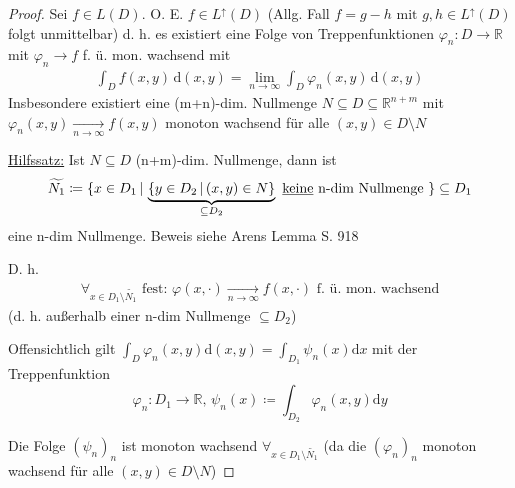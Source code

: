 \begin{proof}
    Sei $f\in L(D)$. O. E. $f\in L^\uparrow (D)$ (Allg. Fall $f=g-h \text{ mit } g,h\in L^\uparrow (D)$ folgt unmittelbar) d. h. es existiert eine Folge von Treppenfunktionen $\varphi_n\colon D \to \mathbb{R}$ mit $\varphi_n \to f$ f. ü. mon. wachsend mit
    \begin{align}\label{GW}
        \int_D f(x,y) \, \text{d}(x,y) = \lim_{n \to \infty} \int_D \varphi_n (x,y) \, \text{d}(x,y)
    \end{align}
    Insbesondere existiert eine (m+n)-dim. Nullmenge $N \subseteq D \subseteq \mathbb{R}^{n+m}$ mit $\varphi_n (x,y) \xrightarrow[n \to\infty]{} f(x,y)$ monoton wachsend für alle $(x,y) \in D\setminus N$

    \underline{Hilfssatz:} Ist $N \subseteq D$ (n+m)-dim. Nullmenge, dann ist
    \[\widetilde{N_1} \coloneqq \{x\in D_1\, | \, \underbrace{\{y\in D_2\, |\, (x,y)\in N\}}_{\subseteq D_2} \text{ \underline{keine} n-dim Nullmenge }\} \subseteq D_1\] eine n-dim Nullmenge. Beweis siehe Arens Lemma S. 918

    D. h.
    \begin{align}\label{GW2}
        \forall_{x\in D_1\setminus \widetilde{N_1}} \text{ fest: } \varphi(x,\cdot) \xrightarrow[n\to\infty]{} f(x,\cdot) \text{ f. ü. mon. wachsend}
    \end{align}
    (d. h. außerhalb einer n-dim Nullmenge $\subseteq D_2$)
    
    Offensichtlich gilt $\int_D \varphi_n (x,y) \text{d}(x,y) = \int_{D_1} \psi_n (x) \text{d}x$ mit der Treppenfunktion
    \[\varphi_n \colon D_1 \to \mathbb{R}, \, \psi_n (x) \coloneqq \int_{D_2} \varphi_n (x,y) \text{d}y\]

    Die Folge $(\psi_n)_n$ ist monoton wachsend $\forall_{x\in D_1\setminus \widetilde{N_1}}$ (da die $(\varphi_n)_n$ monoton wachsend für alle $(x,y) \in D \setminus N$)


\end{proof}
